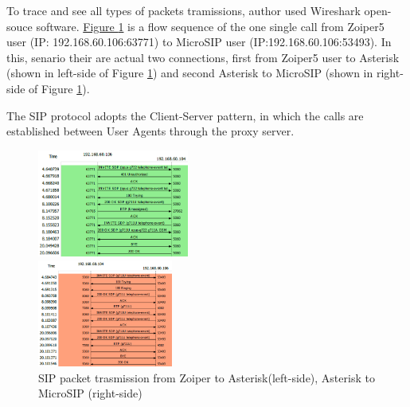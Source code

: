 		To trace and see all types of packets tramissions, author used Wireshark open-souce software. \hyperref[fig:packet-trace]{Figure \ref{fig:packet-trace}} is a flow sequence of the one single call from Zoiper5 user (IP: 192.168.60.106:63771) to MicroSIP user (IP:192.168.60.106:53493). In this, senario their are actual two connections, first from Zoiper5 user to Asterisk (shown in left-side of Figure \ref{fig:packet-trace}) and second Asterisk to MicroSIP (shown in right-side of Figure \ref{fig:packet-trace}).
	
		The SIP protocol adopts the Client-Server pattern, in which the calls are established between User Agents through the proxy server.
				
		\begin{figure}[htbp]
			\begin{minipage}{0.24\textwidth}
				\begin{flushleft}
					\includegraphics[height=100pt,width=\textwidth]{Images/experiment/a1.png}
				\end{flushleft}
			\end{minipage}
			\begin{minipage}{0.24\textwidth}
				\begin{flushright}
					\includegraphics[height=100pt,width=\textwidth]{Images/experiment/a2.png}
				\end{flushright}
			\end{minipage}
			\caption{SIP packet trasmission from Zoiper to Asterisk(left-side), Asterisk to MicroSIP (right-side)}
			\label{fig:packet-trace}
		\end{figure}
				

